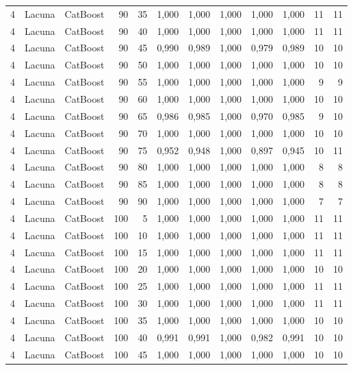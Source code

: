 \begin{longtable}{@{}rllrrrrrrrrr@{}}
4 & Lacuna & CatBoost & 90 & 35 & 1,000 & 1,000 & 1,000 & 1,000 & 1,000 & 11 & 11 \\
4 & Lacuna & CatBoost & 90 & 40 & 1,000 & 1,000 & 1,000 & 1,000 & 1,000 & 11 & 11 \\
4 & Lacuna & CatBoost & 90 & 45 & 0,990 & 0,989 & 1,000 & 0,979 & 0,989 & 10 & 10 \\
4 & Lacuna & CatBoost & 90 & 50 & 1,000 & 1,000 & 1,000 & 1,000 & 1,000 & 10 & 10 \\
4 & Lacuna & CatBoost & 90 & 55 & 1,000 & 1,000 & 1,000 & 1,000 & 1,000 & 9 & 9 \\
4 & Lacuna & CatBoost & 90 & 60 & 1,000 & 1,000 & 1,000 & 1,000 & 1,000 & 10 & 10 \\
4 & Lacuna & CatBoost & 90 & 65 & 0,986 & 0,985 & 1,000 & 0,970 & 0,985 & 9 & 10 \\
4 & Lacuna & CatBoost & 90 & 70 & 1,000 & 1,000 & 1,000 & 1,000 & 1,000 & 10 & 10 \\
4 & Lacuna & CatBoost & 90 & 75 & 0,952 & 0,948 & 1,000 & 0,897 & 0,945 & 10 & 11 \\
4 & Lacuna & CatBoost & 90 & 80 & 1,000 & 1,000 & 1,000 & 1,000 & 1,000 & 8 & 8 \\
4 & Lacuna & CatBoost & 90 & 85 & 1,000 & 1,000 & 1,000 & 1,000 & 1,000 & 8 & 8 \\
4 & Lacuna & CatBoost & 90 & 90 & 1,000 & 1,000 & 1,000 & 1,000 & 1,000 & 7 & 7 \\
4 & Lacuna & CatBoost & 100 & 5 & 1,000 & 1,000 & 1,000 & 1,000 & 1,000 & 11 & 11 \\
4 & Lacuna & CatBoost & 100 & 10 & 1,000 & 1,000 & 1,000 & 1,000 & 1,000 & 11 & 11 \\
4 & Lacuna & CatBoost & 100 & 15 & 1,000 & 1,000 & 1,000 & 1,000 & 1,000 & 11 & 11 \\
4 & Lacuna & CatBoost & 100 & 20 & 1,000 & 1,000 & 1,000 & 1,000 & 1,000 & 10 & 10 \\
4 & Lacuna & CatBoost & 100 & 25 & 1,000 & 1,000 & 1,000 & 1,000 & 1,000 & 11 & 11 \\
4 & Lacuna & CatBoost & 100 & 30 & 1,000 & 1,000 & 1,000 & 1,000 & 1,000 & 11 & 11 \\
4 & Lacuna & CatBoost & 100 & 35 & 1,000 & 1,000 & 1,000 & 1,000 & 1,000 & 10 & 10 \\
4 & Lacuna & CatBoost & 100 & 40 & 0,991 & 0,991 & 1,000 & 0,982 & 0,991 & 10 & 10 \\
4 & Lacuna & CatBoost & 100 & 45 & 1,000 & 1,000 & 1,000 & 1,000 & 1,000 & 10 & 10 \\

\end{longtable}
